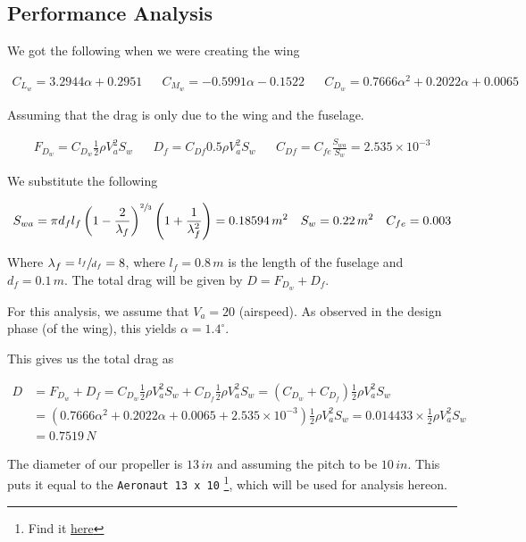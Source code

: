 
\subsection{Performance Analysis}

We got the following when we were creating the wing

\begin{align}
    C_{L_w} = 3.2944 \alpha + 0.2951 &&
    C_{M_w} = -0.5991 \alpha - 0.1522 &&
    C_{D_w} = 0.7666 \alpha^2 + 0.2022 \alpha + 0.0065
    \label{eq:q1-wing-lmdcoeffs-eqs}
\end{align}

Assuming that the drag is only due to the wing and the fuselage.

\begin{align*}
    F_{D_w} = C_{D_w} \frac{1}{2} \rho V_a^2 S_w &&
    D_f = C_{Df} 0.5 \rho V_a^2 S_w &&
    C_{Df} = C_{fe} \frac{S_{wa}}{S_w} = 2.535 \times 10^{-3}
\end{align*}

We substitute the following

\begin{align*}
    S_{wa} = \pi d_f l_f \left ( 1 - \frac{2}{\lambda_f} \right )^{\sfrac{2}{3}} \left ( 1 + \frac{1}{\lambda_f^2} \right ) = 0.18594\,m^2 &&
    S_w = 0.22\,m^2 &&
    C_{fe} = 0.003
\end{align*}

Where $\lambda_f = \sfrac{l_f}{d_f} = 8$, where $l_f = 0.8\,m$ is the length of the fuselage and $d_f = 0.1\,m$. The total drag will be given by $D = F_{D_w} + D_f$.

For this analysis, we assume that $V_a = 20$ (airspeed). As observed in the design phase (of the wing), this yields $\alpha = 1.4^\circ$.

This gives us the total drag as

\begin{align*}
    D &= F_{D_w} + D_f = C_{D_w} \frac{1}{2} \rho V_a^2 S_w + C_{D_f} \frac{1}{2} \rho V_a^2 S_w = \left ( C_{D_w} + C_{D_f} \right ) \frac{1}{2} \rho V_a^2 S_w \\
    &= \left ( 0.7666 \alpha^2 + 0.2022 \alpha + 0.0065 + 2.535 \times 10^{-3} \right ) \frac{1}{2} \rho V_a^2 S_w = 0.014433 \times \frac{1}{2} \rho V_a^2 S_w \\
    &= 0.7519\,N
\end{align*}

The diameter of our propeller is $13\,in$ and assuming the pitch to be $10\,in$. This puts it equal to the \texttt{Aeronaut 13 x 10} \footnote{Find it \href{https://m-selig.ae.illinois.edu/props/volume-3/propDB-volume-3.html}{here}}, which will be used for analysis hereon.

